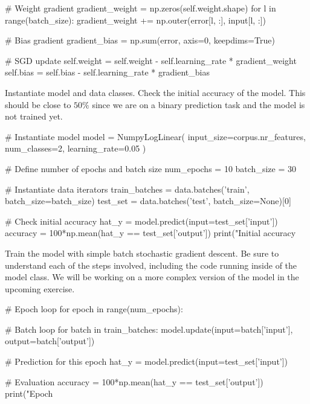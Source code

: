 \begin{exercise}
\begin{python}
        # Weight gradient
        gradient_weight = np.zeros(self.weight.shape)
        for l in range(batch_size):
            gradient_weight += np.outer(error[l, :], input[l, :])

        # Bias gradient
        gradient_bias = np.sum(error, axis=0, keepdims=True)

        # SGD update
        self.weight = self.weight - self.learning_rate * gradient_weight
        self.bias = self.bias - self.learning_rate * gradient_bias
\end{python}
Instantiate model and data classes. Check the initial accuracy of the model. This should be close to $50\%$ since we are on a binary prediction task and the model is not trained yet.
\begin{python}
# Instantiate model
model = NumpyLogLinear(
    input_size=corpus.nr_features,
    num_classes=2,
    learning_rate=0.05
)

# Define number of epochs and batch size
num_epochs = 10
batch_size = 30

# Instantiate data iterators
train_batches = data.batches('train', batch_size=batch_size)
test_set = data.batches('test', batch_size=None)[0]

# Check initial accuracy
hat_y = model.predict(input=test_set['input'])
accuracy = 100*np.mean(hat_y == test_set['output'])
print("Initial accuracy %

\end{python}
Train the model with simple batch stochastic gradient descent. Be sure to understand each of the steps involved, including the code running inside of the model class. We will be working on a more complex version of the model in the upcoming exercise.
\begin{python}
# Epoch loop
for epoch in range(num_epochs):

    # Batch loop
    for batch in train_batches:
        model.update(input=batch['input'], output=batch['output'])

    # Prediction for this epoch
    hat_y = model.predict(input=test_set['input'])

    # Evaluation
    accuracy = 100*np.mean(hat_y == test_set['output'])
    print("Epoch %
\end{python}

\end{exercise}



